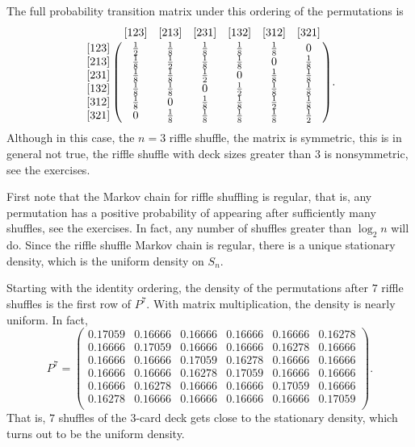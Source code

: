 \documentclass[12pt]{article}
\begin{document}
\begin{example}
    The full probability transition matrix under this ordering of the
    permutations is
    \[
        \bordermatrix{  & [123] & [213] & [231] & [132] & [312] & [321]
        \cr
        [123]   & \frac{1}{2}   & \frac{1}{8}   & \frac{1}{8}   & \frac{1}
        {8}     & \frac{1}{8}   & 0 \cr
        [213]   & \frac{1}{8}   & \frac{1}{2}   & \frac{1}{8}   & \frac{1}
        {8}     & 0     & \frac{1}{8} \cr
        [231]   & \frac{1}{8}   & \frac{1}{8}   & \frac{1}{2}   & 0
        & \frac{1}{8}   & \frac{1}{8} \cr
        [132]   & \frac{1}{8}   & \frac{1}{8}   & 0     & \frac{1}{2}
        & \frac{1}{8}   & \frac{1}{8} \cr
        [312]   & \frac{1}{8}   & 0     & \frac{1}{8}   & \frac{1}{8}
        & \frac{1}{2}   & \frac{1}{8} \cr
        [321]   & 0     & \frac{1}{8}   & \frac{1}{8}   & \frac{1}{8}
        & \frac{1}{8}   & \frac{1}{2} \cr
        }.
    \] Although in this case, the \( n=3 \) riffle shuffle, the matrix
    is symmetric, this is in general not true, the riffle shuffle with
    deck sizes greater than \( 3 \) is nonsymmetric, see the exercises.
\end{example}

First note that the Markov chain for riffle shuffling is regular, that
is, any permutation has a positive probability of appearing after
sufficiently many shuffles, see the exercises.  In fact, any number of shuffles greater
than \( \log_2 n \) will do. Since the riffle shuffle Markov chain is
regular, there is a unique stationary density, which is the uniform
density on \( S_n \).

Starting with the identity ordering, the density of the permutations
after \( 7 \) riffle shuffles is the first row of \( P^7 \).  With
matrix multiplication, the density is nearly uniform. In fact,
\[
    P^7 =
    \begin{pmatrix}
        0.17059 & 0.16666       & 0.16666       & 0.16666       &
        0.16666 & 0.16278 \\
        0.16666 & 0.17059       & 0.16666       & 0.16666       &
        0.16278 & 0.16666 \\
        0.16666 & 0.16666       & 0.17059       & 0.16278       &
        0.16666 & 0.16666 \\
        0.16666 & 0.16666       & 0.16278       & 0.17059       &
        0.16666 & 0.16666 \\
        0.16666 & 0.16278       & 0.16666       & 0.16666       &
        0.17059 & 0.16666 \\
        0.16278 & 0.16666       & 0.16666       & 0.16666       &
        0.16666 & 0.17059 \\
    \end{pmatrix}
    .
\] That is, \( 7 \) shuffles of the 3-card deck gets close to the
stationary density, which turns out to be the uniform density.
\end{document}
